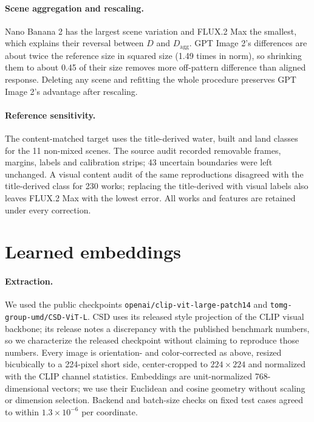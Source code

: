\paragraph{Scene aggregation and rescaling.} Nano Banana 2 has the largest scene variation and
FLUX.2 Max the smallest, which explains their reversal between $D$ and $D_{\mathrm{agg}}$. GPT
Image 2's differences are about twice the reference size in squared size (1.49 times in norm), so
shrinking them to about 0.45 of their size removes more off-pattern difference than aligned
response. Deleting any scene and
refitting the whole procedure preserves GPT Image 2's advantage after rescaling.

\paragraph{Reference sensitivity.} The content-matched target uses the title-derived water,
built and land classes for the 11 non-mixed scenes. The source audit recorded removable
frames, margins, labels and calibration strips; 43 uncertain boundaries were left unchanged. A
visual content audit of the same reproductions disagreed with the title-derived class for 230
works; replacing the title-derived with visual labels also leaves FLUX.2 Max with the lowest
error. All works and features are retained under every correction.

\FloatBarrier
\section{Learned embeddings}\label{app:learned}

\paragraph{Extraction.} We used the public checkpoints
\texttt{openai/\allowbreak clip-\allowbreak vit-\allowbreak large-\allowbreak patch14} and
\texttt{tomg-\allowbreak group-\allowbreak umd/\allowbreak CSD-\allowbreak ViT-\allowbreak L}. CSD uses its released style projection of the CLIP visual
backbone; its release notes a discrepancy with the published benchmark numbers, so we
characterize the released checkpoint without claiming to reproduce those numbers. Every image
is orientation- and color-corrected as above, resized bicubically to a 224-pixel short side,
center-cropped to $224\times224$ and normalized with the CLIP channel statistics. Embeddings
are unit-normalized 768-dimensional vectors; we use their Euclidean and cosine geometry without
scaling or dimension selection. Backend and batch-size checks on fixed test cases agreed to
within $1.3\times10^{-6}$ per coordinate.

